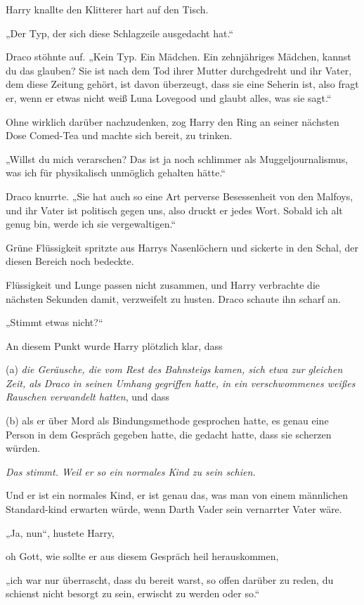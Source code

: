 {Harry knallte den Klitterer hart auf den Tisch.

„Der Typ, der sich diese Schlagzeile ausgedacht hat.“

Draco stöhnte auf. „Kein Typ. Ein Mädchen. Ein zehnjähriges Mädchen, kannst du das glauben? Sie ist nach dem Tod ihrer Mutter durchgedreht und ihr Vater, dem diese Zeitung gehört, ist davon überzeugt, dass sie eine Seherin ist, also fragt er, wenn er etwas nicht weiß Luna Lovegood und glaubt alles, was sie sagt.“

Ohne wirklich darüber nachzudenken, zog Harry den Ring an seiner nächsten Dose Comed-Tea und machte sich bereit, zu trinken.

„Willst du mich verarschen? Das ist ja noch schlimmer als Muggeljournalismus, was ich für physikalisch unmöglich gehalten hätte.“

Draco knurrte. „Sie hat auch so eine Art perverse Besessenheit von den Malfoys, und ihr Vater ist politisch gegen uns, also druckt er jedes Wort. Sobald ich alt genug bin, werde ich sie vergewaltigen.“

Grüne Flüssigkeit spritzte aus Harrys Nasenlöchern und sickerte in den Schal, der diesen Bereich noch bedeckte.

Flüssigkeit und Lunge passen nicht zusammen, und Harry verbrachte die nächsten Sekunden damit, verzweifelt zu husten. Draco schaute ihn scharf an.

„Stimmt etwas nicht?“

An diesem Punkt wurde Harry plötzlich klar, dass

(a) \emph{die Geräusche, die vom Rest des Bahnsteigs kamen, sich etwa zur gleichen Zeit, als Draco in seinen Umhang gegriffen hatte, in ein verschwommenes weißes Rauschen verwandelt hatten}, und dass

(b) als er über Mord als Bindungsmethode gesprochen hatte, es genau eine Person in dem Gespräch gegeben hatte, die gedacht hatte, dass sie scherzen würden.

\emph{Das stimmt. Weil er so ein normales Kind zu sein schien.}

Und er ist ein normales Kind, er ist genau das, was man von einem männlichen Standard-kind erwarten würde, wenn Darth Vader sein vernarrter Vater wäre.

„Ja, nun“, hustete Harry,

oh Gott, wie sollte er aus diesem Gespräch heil herauskommen,

„ich war nur überrascht, dass du bereit warst, so offen darüber zu reden, du schienst nicht besorgt zu sein, erwischt zu werden oder so.“

}
